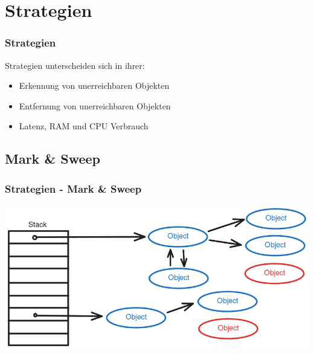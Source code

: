 \documentclass{beamer}
\begin{document}
    \section{Strategien}
        \begin{frame}
            \frametitle{Strategien}

            Strategien unterscheiden sich in ihrer:

            \begin{itemize}
                \item Erkennung von unerreichbaren Objekten
                \item Entfernung von unerreichbaren Objekten
                \item Latenz, RAM und CPU Verbrauch
            \end{itemize}
        \end{frame}

        \subsection{Mark \& Sweep}

            \begin{frame}
                \frametitle{Strategien - Mark \& Sweep}
                \includegraphics[width=\textwidth]{images/Mark_nd_Sweep.png}
            \end{frame}
\end{document}
